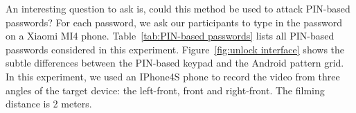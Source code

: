         An interesting question to ask is, could this method be used to
        attack PIN-based passwords? 
        For each password, we ask our participants to type in the
        password on a Xiaomi MI4 phone. Table~\ref{tab:PIN-based passwords}
        lists all PIN-based passwords considered in this experiment. Figure~\ref{fig:unlock interface}
        shows the subtle differences between the PIN-based keypad and the
        Android pattern grid. In this experiment, we used an IPhone4S phone
        to record the video from three angles of the target device: the
        left-front, front and right-front. The filming distance is 2 meters.

